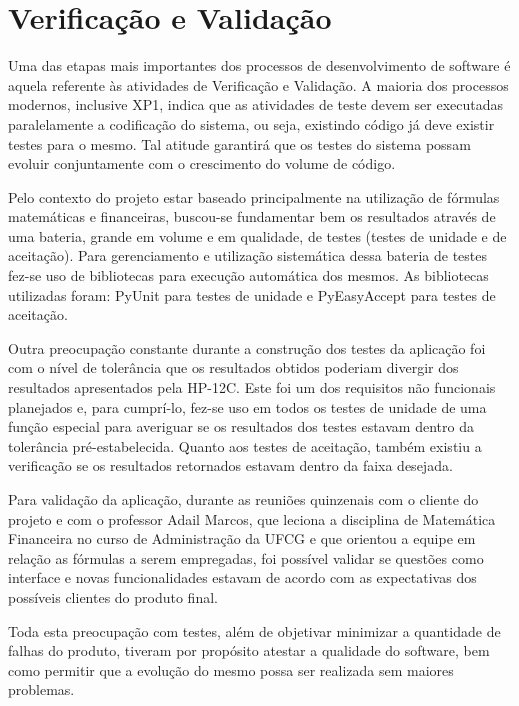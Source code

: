 \chapter{Verificação e Validação}

Uma das etapas mais importantes dos processos de desenvolvimento de software é aquela re\-ferente às atividades de Verificação e Validação. A maioria dos processos modernos, inclusive XP1, indica que as atividades de teste devem ser executadas paralelamente a codificação do sistema, ou seja, existindo código já deve existir testes para o mesmo. Tal atitude garantirá que os testes do sistema possam evoluir conjuntamente com o crescimento do volume de código.

Pelo contexto do projeto estar baseado principalmente na utilização de fórmulas matemáticas e financeiras, buscou-se fundamentar bem os resultados através de uma bateria, grande em volume e em qualidade, de testes (testes de unidade e de aceitação). Para gerenciamento e utilização sistemática dessa bateria de testes fez-se uso de bibliotecas para execução automática dos mesmos. As bibliotecas utilizadas foram: PyUnit para testes de unidade e PyEasyAccept para testes de aceitação.

Outra preocupação constante durante a construção dos testes da aplicação foi com o nível de tolerância que os resultados obtidos poderiam divergir dos resultados apresentados pela HP-12C. Este foi um dos requisitos não funcionais planejados e, para cumprí-lo, fez-se uso em todos os testes de unidade de uma função especial para averiguar se os resultados dos testes estavam dentro da tolerância pré-estabelecida. Quanto aos testes de aceitação, também existiu a verificação se os resultados retornados estavam dentro da faixa desejada.

Para validação da aplicação, durante as reuniões quinzenais com o cliente do projeto e com o professor Adail Marcos, que leciona a disciplina de Matemática Financeira no curso de Administração da UFCG e que orientou a equipe em relação as fórmulas a serem empregadas, foi possível validar se questões como interface e novas funcionalidades estavam de acordo com as expectativas dos possíveis clientes do produto final.

Toda esta preocupação com testes, além de objetivar minimizar a quantidade de falhas do produto, tiveram por propósito atestar a qualidade do software, bem como permitir que a evolução do mesmo possa ser realizada sem maiores problemas.

